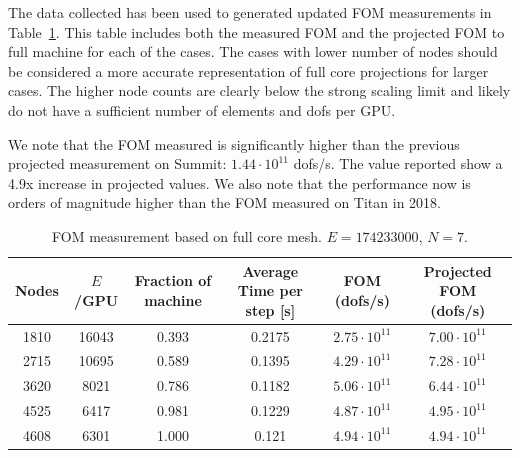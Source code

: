 The data collected has been used to generated updated FOM measurements in Table~\ref{tab:FOM}. This table includes both the measured FOM and the projected FOM to full machine for each of the cases. The cases with lower number of nodes should be considered a more accurate representation of full core projections for larger cases. The higher node counts are clearly below the strong scaling limit and likely do not have a sufficient number of elements and dofs per GPU.

We note that the FOM measured is significantly higher than the previous projected measurement on Summit: $1.44 \cdot 10^{11}$ dofs/s. The value reported show a 4.9x increase in projected values. We also note that the performance now is orders of magnitude higher than the FOM measured on Titan in 2018.


 \begin{table} \centering \small
   \begin{tabular}{cccccc} \hline \hline
    Nodes & $E$/GPU & Fraction of machine & Average Time per step [s] & FOM (dofs/s) & Projected FOM (dofs/s) \\ \hline
    1810 & 	16043 & 0.393 &	0.2175  & $2.75 \cdot 10^{11}$ & $7.00 \cdot 10^{11}$ \\
    2715 &	10695 & 0.589 &	0.1395  & $4.29 \cdot 10^{11}$ & $7.28 \cdot 10^{11}$ \\
    3620 &	8021 & 0.786 &	0.1182  & $5.06 \cdot 10^{11}$ & $6.44 \cdot 10^{11}$ \\
    4525 &	6417 & 0.981 &	0.1229  & $4.87 \cdot 10^{11}$ & $4.95 \cdot 10^{11}$ \\
    4608 &	6301 & 1.000 &	0.121   & $4.94 \cdot 10^{11}$ & $4.94 \cdot 10^{11}$ \\
     \hline \hline
  \end{tabular}
   \caption{FOM measurement based on full core mesh. $E=174233000$, $N=7$.}
   \label{tab:FOM}
  \end{table}

